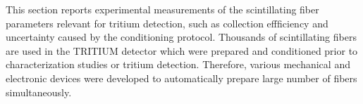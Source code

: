 This section reports experimental measurements of the scintillating fiber parameters relevant for tritium detection, such as collection effficiency and uncertainty caused by the conditioning protocol. Thousands of scintillating fibers are used in the TRITIUM detector which were prepared and conditioned prior to characterization studies or tritium detection. Therefore, various mechanical and electronic devices were developed to automatically prepare large number of fibers simultaneously.